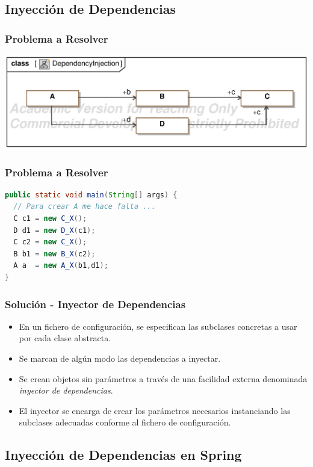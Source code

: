 \documentclass[a4paper,t,xcolor=pst,dvips,colortheme]{beamer}
\begin{document}
\subsection{Inyección de Dependencias}

\begin{frame}[c]
	\frametitle{Problema a Resolver}
	\begin{center}
        \includegraphics[width=\linewidth,keepaspectratio=true]{images/iod/DependencyInjection.eps}
	\end{center}
\end{frame}

\begin{frame}[c,fragile]
	\frametitle{Problema a Resolver}
\begin{lstlisting}[basicstyle=\footnotesize,language=Java]
public static void main(String[] args) {
  // Para crear A me hace falta ...
  C c1 = new C_X();
  D d1 = new D_X(c1);
  C c2 = new C_X();
  B b1 = new B_X(c2);
  A a  = new A_X(b1,d1);
}
\end{lstlisting}
\end{frame}

\begin{frame}[c]
	\frametitle{Solución - Inyector de Dependencias}
    \begin{itemize}[<+->]
        \item En un fichero de configuración, se especifican las subclases concretas a usar por cada clase abstracta.
        \item Se marcan de algún modo las dependencias a inyectar.
        \item Se crean objetos \alert{sin parámetros} a través de una facilidad externa denominada \emph{inyector de dependencias}.
        \item El inyector se encarga de crear los parámetros necesarios instanciando las subclases adecuadas conforme al fichero de configuración.
    \end{itemize}
\end{frame}

\subsection{Inyección de Dependencias en Spring}
\end{document}
